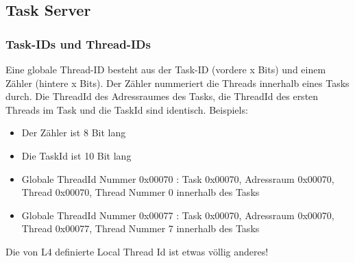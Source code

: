 \subsection{Task Server}




\subsubsection{Task-IDs und Thread-IDs}

Eine globale Thread-ID besteht aus der Task-ID (vordere x Bits) und einem Zähler (hintere x Bits). Der Zähler nummeriert die Threads innerhalb eines Tasks durch. Die ThreadId des Adressraumes des Tasks, die ThreadId des ersten Threads im Task und die TaskId sind identisch. Beispiels:

\begin{itemize}
	\item Der Zähler ist 8 Bit lang
	\item Die TaskId ist 10 Bit lang
	\item Globale ThreadId Nummer 0x00070 : Task 0x00070, Adressraum 0x00070, Thread 0x00070, Thread Nummer 0 innerhalb des Tasks
	\item Globale ThreadId Nummer 0x00077 : Task 0x00070, Adressraum 0x00070, Thread 0x00077, Thread Nummer 7 innerhalb des Tasks
\end{itemize}

Die von L4 definierte Local Thread Id ist etwas völlig anderes!